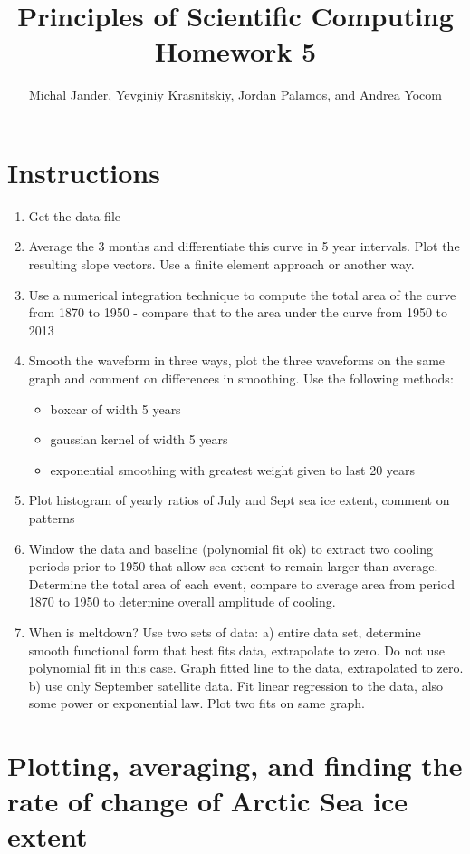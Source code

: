 \documentclass[12pt,a4paper]{article} %
\title{Principles of Scientific Computing Homework 5}
\author{Michal Jander, Yevginiy Krasnitskiy, Jordan Palamos, and Andrea Yocom}
\begin{document}
 
\maketitle	
\tableofcontents

\section{Instructions}
\begin{enumerate}
\item Get the data file
\item Average the 3 months and differentiate this curve in 5 year intervals. Plot the resulting slope vectors. Use a finite element approach or another way.
\item Use a numerical integration technique to compute the total area of the curve from 1870 to 1950 - compare that to the area under the curve from 1950 to 2013
\item Smooth the waveform in three ways, plot the three waveforms on the same graph and comment on differences in smoothing. Use the following methods:
	\begin{itemize}
	\item boxcar of width 5 years
	\item gaussian kernel of width 5 years
	\item exponential smoothing with greatest weight given to last 20 years
	\end{itemize}
\item Plot histogram of yearly ratios of July and Sept sea ice extent, comment on patterns
\item Window the data and baseline (polynomial fit ok) to extract two cooling periods prior to 1950 that allow sea extent to remain larger than average. Determine the total area of each event, compare to average area from period 1870 to 1950 to determine overall amplitude of cooling.
\item When is meltdown? Use two sets of data:
  a) entire data set, determine smooth functional form that best fits data, extrapolate to zero. Do not use polynomial fit in this case. Graph fitted line to the data, extrapolated to zero.
  b) use only September satellite data. Fit linear regression to the data, also some power or exponential law. Plot two fits on same graph.
\end{enumerate}


\section{Plotting, averaging, and finding the rate of change of Arctic Sea ice extent}
\end{document}
